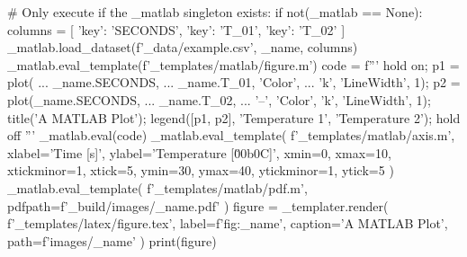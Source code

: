 # Only execute if the _matlab singleton exists:
if not(_matlab == None):
    columns = [
        {'key': 'SECONDS'},
        {'key': 'T_01'},
        {'key': 'T_02'}
    ]
    _matlab.load_dataset(f'{_data}/example.csv', _name, columns)
    _matlab.eval_template(f'{_templates}/matlab/figure.m')
    code = f'''
        hold on;
        p1 = plot( ...
            {_name}.SECONDS, ...
            {_name}.T_01, 'Color',  ...
            'k', 'LineWidth', 1);
        p2 = plot({_name}.SECONDS, ...
            {_name}.T_02, ...
            '--', 'Color', 'k', 'LineWidth', 1);
        title('A MATLAB Plot');
        legend([p1, p2], 'Temperature 1', 'Temperature 2');
        hold off
    '''
    _matlab.eval(code)
    _matlab.eval_template(
        f'{_templates}/matlab/axis.m',
        xlabel='Time [s]',
        ylabel='Temperature [\u00b0C]',
        xmin=0,
        xmax=10,
        xtickminor=1,
        xtick=5,
        ymin=30,
        ymax=40,
        ytickminor=1,
        ytick=5
    )
    _matlab.eval_template(
        f'{_templates}/matlab/pdf.m',
        pdfpath=f'{_build}/images/{_name}.pdf'
    )
figure = _templater.render(
    f'{_templates}/latex/figure.tex',
    label=f'fig:{_name}',
    caption='A MATLAB Plot',
    path=f'images/{_name}'
)
print(figure)

